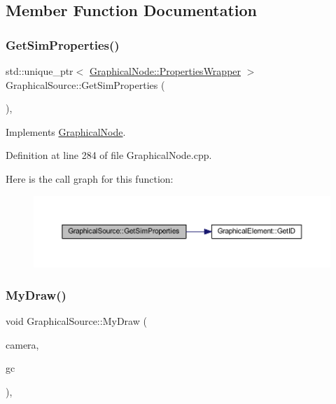 \subsection{Member Function Documentation}
\mbox{\label{class_graphical_source_a3b7bb7a964e5a5b3a815a005711bb573}} 
\subsubsection{\texorpdfstring{Get\+Sim\+Properties()}{GetSimProperties()}}
{\footnotesize\ttfamily std\+::unique\+\_\+ptr$<$ \hyperlink{class_graphical_node_1_1_properties_wrapper}{Graphical\+Node\+::\+Properties\+Wrapper} $>$ Graphical\+Source\+::\+Get\+Sim\+Properties (\begin{DoxyParamCaption}{ }\end{DoxyParamCaption})\hspace{0.3cm}{\ttfamily [override]}, {\ttfamily [virtual]}}



Implements \hyperlink{class_graphical_node_a2ad6386709ceabfbf97daabf4c6cd64a}{Graphical\+Node}.



Definition at line 284 of file Graphical\+Node.\+cpp.

Here is the call graph for this function\+:
\nopagebreak
\begin{figure}[H]
\begin{center}
\leavevmode
\includegraphics[width=350pt]{class_graphical_source_a3b7bb7a964e5a5b3a815a005711bb573_cgraph}
\end{center}
\end{figure}
\mbox{\label{class_graphical_source_af01b1de06f0e6653edd60b59a279b154}} 
\subsubsection{\texorpdfstring{My\+Draw()}{MyDraw()}}
{\footnotesize\ttfamily void Graphical\+Source\+::\+My\+Draw (\begin{DoxyParamCaption}\item[{const wx\+Affine\+Matrix2D \&}]{camera,  }\item[{wx\+Graphics\+Context $\ast$}]{gc }\end{DoxyParamCaption})\hspace{0.3cm}{\ttfamily [override]}, {\ttfamily [virtual]}}



